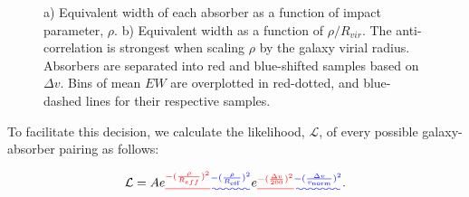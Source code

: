 \documentclass[twocolumn,tighten]{aastex6}
\providecommand{\DIFadd}[1]{{\protect\color{blue}\uwave{#1}}} %
\providecommand{\DIFdel}[1]{{\protect\color{red}\sout{#1}}}                      %
\providecommand{\DIFaddbegin}{} %
\providecommand{\DIFaddend}{} %
\providecommand{\DIFdelbegin}{} %
\providecommand{\DIFdelend}{} %
\providecommand{\DIFaddbeginFL}{} %
\providecommand{\DIFaddendFL}{} %
\providecommand{\DIFdelbeginFL}{} %
\providecommand{\DIFdelendFL}{} %
\begin{document}
\begin{figure}[t]
\centering
{}
\caption{\DIFdelbeginFL %
\DIFdelendFL \DIFaddbeginFL \small{a) Equivalent width of each absorber as a function of impact parameter, $\rho$. b) Equivalent width as a function of $\rho/R_{vir}$. The anti-correlation is strongest when scaling $\rho$ by the galaxy virial radius. Absorbers are separated into red and blue-shifted samples based on $\Delta v$. Bins of mean $EW$ are overplotted in red-dotted, and blue-dashed lines for their respective samples.}\DIFaddendFL }
\vspace{5pt}
\end{figure}


To facilitate this decision, we calculate the likelihood, $\mathcal{L}$, of every possible galaxy-absorber pairing as follows:

\begin{equation}
	\mathcal{L} = A e\DIFdelbegin \DIFdel{^{-(\frac{\rho}{R_{eff}})^2} }\DIFdelend \DIFaddbegin \DIFadd{^{-(\frac{\rho}{R_{\rm eff}})^2} }\DIFaddend e\DIFdelbegin \DIFdel{^{-(\frac{\Delta v}{200})^2}}\DIFdelend \DIFaddbegin \DIFadd{^{-(\frac{\Delta v}{v_{\rm norm}})^2}}\DIFaddend .
\end{equation}
\end{document}
